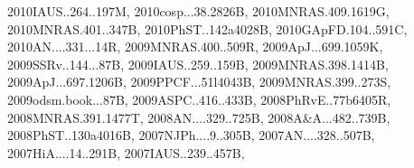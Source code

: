 \documentclass[12pt]{article}
\begin{document}
\begin{enumerate}
\begin{enumerate}
{2010IAUS..264..197M,%
2010cosp...38.2826B,%
2010MNRAS.409.1619G,%
2010MNRAS.401..347B,%
2010PhST..142a4028B,%
2010GApFD.104..591C,%
2010AN....331...14R,%
2009MNRAS.400..509R,%
2009ApJ...699.1059K,%
2009SSRv..144...87B,%
2009IAUS..259..159B,%
2009MNRAS.398.1414B,%
2009ApJ...697.1206B,%
2009PPCF...51l4043B,%
2009MNRAS.399..273S,%
2009odsm.book...87B,%
2009ASPC..416..433B,%
2008PhRvE..77b6405R,%
2008MNRAS.391.1477T,%
2008AN....329..725B,%
2008A&A...482..739B,%
2008PhST..130a4016B,%
2007NJPh....9..305B,%
2007AN....328..507B,%
2007HiA....14..291B,%
2007IAUS..239..457B,%
}
\end{enumerate}
\end{enumerate}
\end{document}
